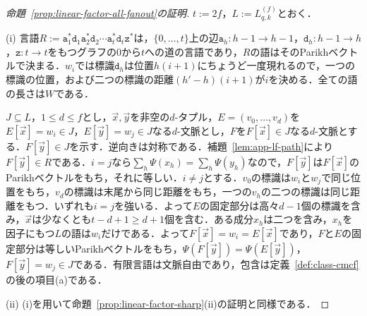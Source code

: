 \documentclass[11pt,a4paper]{ltjsarticle}
\numberwithin{equation}{section}
\theoremstyle{plain}
\theoremstyle{definition}
\theoremstyle{remark}
\newcommand{\tuple}[1]{\vec{#1}}
\begin{document}
\begin{proof}[命題~\ref{prop:linear-factor-all-fanout}の証明]
$t:=2f$，$L:=L^{(f)}_{q,k}$とおく．

(i) 言語$R:=\mathtt a_1^*\mathtt d_1\mathtt a_2^*\mathtt d_2\cdots\mathtt a_t^*\mathtt d_t\mathtt z^*$は，$\{0,\ldots,t\}$上の辺$\mathtt a_h:h-1\to h-1$，$\mathtt d_h:h-1\to h$，$\mathtt z:t\to t$をもつグラフの$0$から$t$への道の言語であり，$R$の語はそのParikhベクトルで決まる．$w_i$では標識$\mathtt d_h$は位置$h(i+1)$にちょうど一度現れるので，一つの標識の位置，および二つの標識の距離$(h'-h)(i+1)$が$i$を決める．全ての語の長さは$W$である．

$J\subseteq L$，$1\le d\le f$とし，$\tuple x,\tuple y$を非空の$d$-タプル，$E=(v_0,\ldots,v_d)$を$E[\tuple x]=w_i\in J$，$E[\tuple y]=w_j\in J$なる$d$-文脈とし，$F$を$F[\tuple x]\in J$なる$d$-文脈とする．$F[\tuple y]\in J$を示す．逆向きは対称である．補題~\ref{lem:app-lf-path}により$F[\tuple y]\in R$である．$i=j$なら$\sum_h\Psi(x_h)=\sum_h\Psi(y_h)$なので，$F[\tuple y]$は$F[\tuple x]$のParikhベクトルをもち，それに等しい．$i\ne j$とする．$v_0$の標識は$w_i$と$w_j$で同じ位置をもち，$v_d$の標識は末尾から同じ距離をもち，一つの$v_h$の二つの標識は同じ距離をもつ．いずれも$i=j$を強いる．よって$E$の固定部分は高々$d-1$個の標識を含み，$\tuple x$は少なくとも$t-d+1\ge d+1$個を含む．ある成分$x_h$は二つを含み，$x_h$を因子にもつ$L$の語は$w_i$だけである．よって$F[\tuple x]=w_i=E[\tuple x]$であり，$F$と$E$の固定部分は等しいParikhベクトルをもち，$\Psi(F[\tuple y])=\Psi(E[\tuple y])$，$F[\tuple y]=w_j\in J$である．有限言語は文脈自由であり，包含は定義~\ref{def:class-cmcf}の後の項目(a)である．

(ii) (i)を用いて命題~\ref{prop:linear-factor-sharp}(ii)の証明と同様である．


\end{proof}
\end{document}
